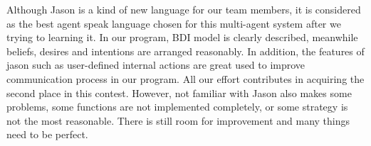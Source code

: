 Although Jason is a kind of new language for our team members, it is considered as the best agent speak language chosen for this multi-agent system after we trying to learning it. In our program, BDI model is clearly described, meanwhile beliefs, desires and intentions are arranged reasonably. In addition, the features of jason such as user-defined internal actions are great used to improve communication process in our program. All our effort contributes in acquiring the second place in this contest. However, not familiar with Jason also makes some problems, some functions are not implemented completely, or some strategy is not the most reasonable. There is still room for improvement and many things need to be perfect.
